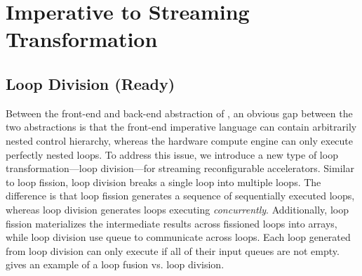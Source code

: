\section{Imperative to Streaming Transformation}
\label{sec:control}



\subsection{Loop Division (Ready)}
Between the front-end and back-end abstraction of \name, an obvious gap between the two abstractions is that the front-end imperative language can contain arbitrarily nested control hierarchy, whereas
the hardware compute engine can only execute perfectly nested loops.
To address this issue, we introduce a new type of loop transformation---loop division---for streaming reconfigurable
accelerators.
Similar to loop fission, loop division breaks a single loop into multiple loops.
The difference is that loop fission generates a sequence of sequentially executed loops, whereas
loop division generates loops executing \emph{concurrently}.
Additionally, loop fission materializes the intermediate results across fissioned loops into arrays,
while loop division use queue to communicate across loops.
Each loop generated from loop division can only execute if all of their input queues are not empty.
 gives an example of a loop fusion vs. loop division.


